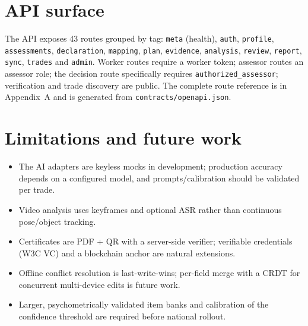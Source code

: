 \documentclass[11pt,a4paper]{article}
\newcommand{\code}[1]{\texttt{\small #1}}
\begin{document}
\section{API surface}
The API exposes 43 routes grouped by tag: \code{meta} (health),
\code{auth}, \code{profile}, \code{assessments}, \code{declaration},
\code{mapping}, \code{plan}, \code{evidence}, \code{analysis},
\code{review}, \code{report}, \code{sync}, \code{trades} and \code{admin}.
Worker routes require a worker token; assessor routes an assessor role; the
decision route specifically requires \code{authorized_assessor}; verification
and trade discovery are public. The complete route reference is in
Appendix~A and is generated from \code{contracts/openapi.json}.

\section{Limitations and future work}
\begin{itemize}
\item The AI adapters are keyless mocks in development; production accuracy
      depends on a configured model, and prompts/calibration should be
      validated per trade.
\item Video analysis uses keyframes and optional ASR rather than continuous
      pose/object tracking.
\item Certificates are PDF + QR with a server-side verifier; verifiable
      credentials (W3C VC) and a blockchain anchor are natural extensions.
\item Offline conflict resolution is last-write-wins; per-field merge with a
      CRDT for concurrent multi-device edits is future work.
\item Larger, psychometrically validated item banks and calibration of the
      confidence threshold are required before national rollout.
\end{itemize}

\newpage
\appendix
\end{document}
